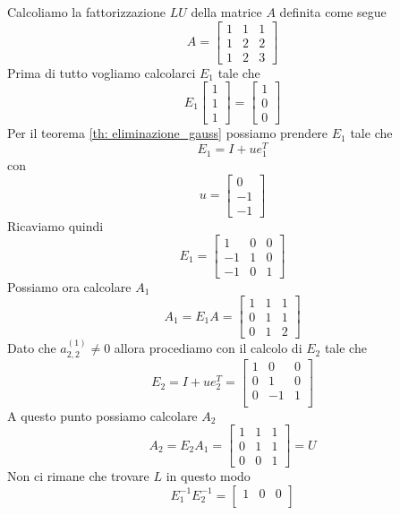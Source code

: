 \begin{example}
	Calcoliamo la fattorizzazione $LU$ della matrice $A$ definita come segue
	\[ A = \begin{bmatrix}
			1 & 1 & 1 \\
			1 & 2 & 2 \\
			1 & 2 & 3
		\end{bmatrix}
	\]
	Prima di tutto vogliamo calcolarci $E_1$ tale che
	\[ E_1 \begin{bmatrix}
			1 \\ 1 \\ 1
		\end{bmatrix} = \begin{bmatrix}
			1 \\ 0 \\ 0
		\end{bmatrix}
	\]
	Per il teorema \ref{th: eliminazione_gauss} possiamo prendere $E_1$ tale che
	\[ E_1 = I + u e_1^T \]
	con
	\[ u = \begin{bmatrix} 0 \\ -1 \\ -1 \end{bmatrix} \]
	Ricaviamo quindi
	\[
		E_1 = \begin{bmatrix}
			1  & 0 & 0 \\
			-1 & 1 & 0 \\
			-1 & 0 & 1
		\end{bmatrix}
	\]
	Possiamo ora calcolare $A_1$
	\[
		A_1 = E_1 A = \begin{bmatrix}
			1 & 1 & 1 \\
			0 & 1 & 1 \\
			0 & 1 & 2
		\end{bmatrix}
	\]
	Dato che $a_{2,2}^{(1)} \neq 0$ allora procediamo con il calcolo di $E_2$ tale che
	\[
		E_2 = I + u e_2^T = \begin{bmatrix}
			1 & 0  & 0 \\
			0 & 1  & 0 \\
			0 & -1 & 1 \\
		\end{bmatrix}
	\]
	A questo punto possiamo calcolare $A_2$
	\[
		A_2 = E_2 A_1 = \begin{bmatrix}
			1 & 1 & 1 \\
			0 & 1 & 1 \\
			0 & 0 & 1
		\end{bmatrix} = U
	\]
	Non ci rimane che trovare $L$ in questo modo
	\[
		E_1^{-1} E_2^{-1} = \begin{bmatrix}
			1 & 0 & 0 \\

\end{bmatrix}\]
\end{example}
